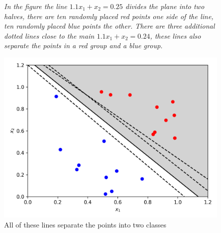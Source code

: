 \documentclass[12pt]{article}
\begin{document}
\begin{figure}
               {{\textsl{In the figure the line $1.1x_1+x_2=0.25$ divides the plane into two halves, there are ten randomly placed red points one side of the line, ten randomly placed blue points the other. There are three additional dotted lines close to the main $1.1x_1+x_2=0.24$, these lines also separate the points in a red group and a blue group.}}}
                            {
\begin{center}  
  \includegraphics{random_points.png}
\end{center}
}\caption{All of these lines separate the points into two classes\label{fig:random_points}}
\end{figure}
\end{document}
